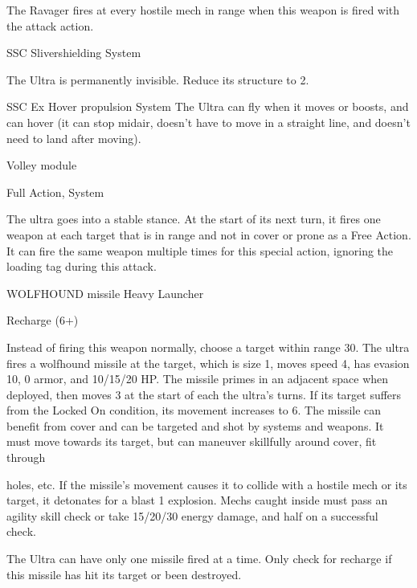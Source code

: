 The Ravager fires at every hostile mech in range when this weapon is fired with the attack action.


SSC Slivershielding
System

The Ultra is permanently invisible. Reduce its structure to 2.


SSC Ex Hover propulsion
System
The Ultra can fly when it moves or boosts, and can hover (it can stop midair, doesn't have to
move in a straight line, and doesn't need to land after moving).


Volley module

Full Action, System

The ultra goes into a stable stance. At the start of its next turn, it fires one weapon at each target
that is in range and not in cover or prone as a Free Action. It can fire the same weapon multiple
times for this special action, ignoring the loading tag during this attack.


WOLFHOUND missile
Heavy Launcher

Recharge (6+)

Instead of firing this weapon normally, choose a target within range 30. The ultra fires a
wolfhound missile at the target, which is size 1, moves speed 4, has evasion 10, 0 armor, and
10/15/20 HP. The missile primes in an adjacent space when deployed, then moves 3 at the start
of each the ultra's turns. If its target suffers from the Locked On condition, its movement
increases to 6. The missile can benefit from cover and can be targeted and shot by systems and
weapons. It must move towards its target, but can maneuver skillfully around cover, fit through




holes, etc. If the missile's movement causes it to collide with a hostile mech or its target, it
detonates for a blast 1 explosion. Mechs caught inside must pass an agility skill check or take
15/20/30 energy damage, and half on a successful check.


The Ultra can have only one missile fired at a time. Only check for recharge if this missile has hit
its target or been destroyed.